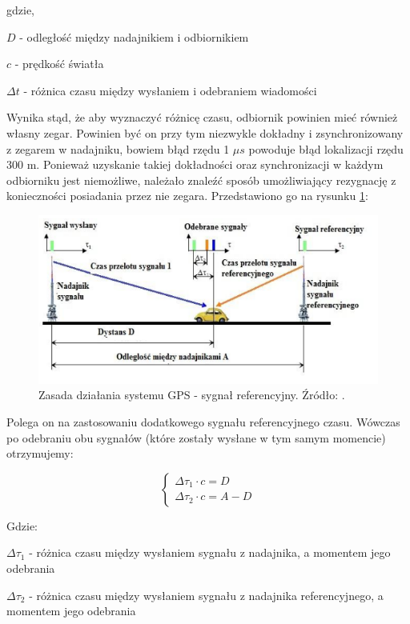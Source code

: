 gdzie,

$D$ - odległość między nadajnikiem i odbiornikiem

$c$ - prędkość światła

$\Delta t$ - różnica czasu między wysłaniem i odebraniem wiadomości

Wynika stąd, że aby wyznaczyć różnicę czasu, odbiornik powinien mieć również własny zegar. Powinien być on przy tym niezwykle dokładny i zsynchronizowany z zegarem w nadajniku, bowiem błąd rzędu 1 $\mu s$ powoduje błąd lokalizacji rzędu 300 m. Ponieważ uzyskanie takiej dokładności oraz synchronizacji w każdym odbiorniku jest niemożliwe, należało znaleźć sposób umożliwiający rezygnację z konieczności posiadania przez nie zegara. Przedstawiono go na rysunku \ref{fig:image_gps_basics2}:

\begin{figure}[H]
	\centering
	\includegraphics[width=12cm]{img/theory/GPS/gps_basics2.png}
	\caption{Zasada działania systemu GPS - sygnał referencyjny. Źródło: \cite{inzynierka}.}
	\label{fig:image_gps_basics2}
\end{figure}

Polega on na zastosowaniu dodatkowego sygnału referencyjnego czasu. Wówczas po odebraniu obu sygnałów (które zostały wysłane w tym samym momencie) otrzymujemy:

\begin{equation}
\begin{cases}
\Delta \tau_1 \cdot c = D \\ 
\Delta \tau_2 \cdot c = A - D
\end{cases}
\end{equation}

\pagebreak
Gdzie:

$\Delta\tau_1$ - różnica czasu między wysłaniem sygnału z nadajnika, a momentem jego odebrania

$\Delta\tau_2$ - różnica czasu między wysłaniem sygnału z nadajnika referencyjnego, a momentem jego odebrania

